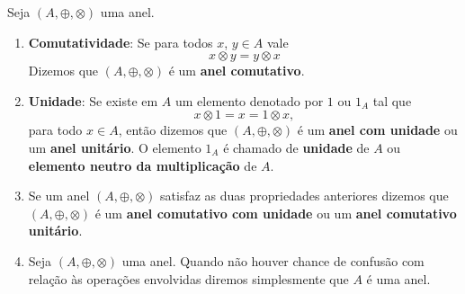 \begin{observacoes}
	Seja $(A, \oplus, \otimes)$ uma anel.
	\begin{enumerate}
		\item \textbf{Comutatividade}: Se para todos $x$, $y \in A$ vale
		\[
			x \otimes y = y \otimes x
		\]
		Dizemos que $(A, \oplus, \otimes)$ {\'e} um \textbf{anel comutativo}.

		\item \textbf{Unidade}: Se existe em $A$ um elemento denotado por $1$ ou $1_{A}$ tal que
		\[
			x \otimes 1 = x = 1 \otimes x,
		\]
		para todo $x \in A$, ent{\~a}o dizemos que $(A, \oplus, \otimes)$ \'e um \textbf{anel com unidade} ou um \textbf{anel unit{\'a}rio}. O elemento $1_A$ {\'e} chamado de \textbf{unidade} de $A$ ou \textbf{elemento neutro da multiplica\c{c}\~ao} de $A$.

		\item Se um anel $(A, \oplus, \otimes)$ satisfaz as duas propriedades anteriores dizemos que $(A, \oplus, \otimes)$ \'e um \textbf{anel comutativo com unidade} ou um \textbf{anel comutativo unit\'ario}.

		\item Seja $(A, \oplus, \otimes)$ uma anel. Quando n\~ao houver chance de confus\~ao com rela\c{c}\~ao \`as opera\c{c}\~oes envolvidas diremos simplesmente que $A$ \'e uma anel.
	\end{enumerate}
\end{observacoes}


